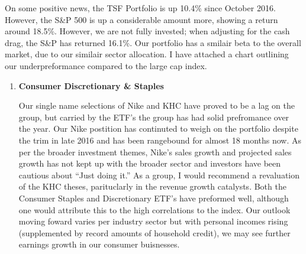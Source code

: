 \documentclass[11pt,pressrelease]{newlfm} %
\begin{document}
\begin{newlfm}


\begin{singlespace} 		%
On some positive news, the TSF Portfolio is up 10.4\% since October 2016. However, the S\&P 500 is up a considerable amount more, showing a return around 18.5\%. However, we are not fully invested; when adjusting for the cash drag, the S\&P has returned 16.1\%. Our portfolio has a smilair beta to the overall market, due to our similair sector allocation. I have attached a chart outlining our underpreformance compared to the large cap index.

\begin{enumerate}
\item \textbf{Consumer Discretionary \& Staples} \par
Our single name selections of Nike and KHC have proved to be a lag on the group, but carried by the ETF's the group has had solid prefromance over the year.
Our Nike postition has continuted to weigh on the portfolio despite the trim in late 2016 and has been rangebound for almost 18 months now. As per the broader investment themes, Nike's sales growth and projected sales growth has not kept up with the broader sector and investors have been cautious about ``Just doing it.'' As a group, I would recommend a revaluation of the KHC theses, parituclarly in the revenue growth catalysts. Both the Consumer Staples and Discretionary ETF’s have preformed well, although one would attribute this to the high correlations to the index. Our outlook moving foward varies per industry sector but with personal incomes rising (supplemented by record amounts of household credit), we may see further earnings growth in our consumer buisnesses. %


\end{enumerate}
\end{singlespace}
\end{newlfm}
\end{document}
